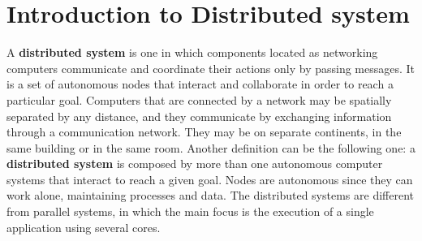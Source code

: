 \documentclass[11pt,a4paper]{article}
\begin{document}

\newcommand{\titolo}  {Afternotes}
\newcommand{\versione}{2.0}




\section{Introduction to Distributed system}
A \textbf{distributed system} is one in which components located as networking computers
communicate and coordinate their actions only by passing messages. It is a set of autonomous nodes that interact and collaborate in order to reach a particular goal. Computers that are connected by a network may be spatially separated by any distance, and they communicate by exchanging information through a communication network. They may be on separate continents, in the same building or in the same room.
Another definition can be the following one: a \textbf{distributed system} is composed by more than one autonomous computer systems that interact to reach a given goal. Nodes are autonomous since they can work alone, maintaining processes and data.
The distributed systems are different from parallel systems, in which the main focus is the execution of a single application using several cores.
  
\end{document}
